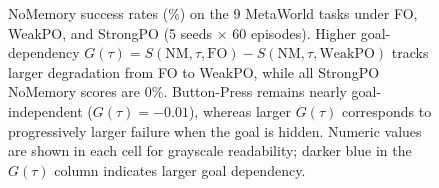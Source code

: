 \begin{figure}[t]
\caption{NoMemory success rates (\%) on the 9 MetaWorld tasks under FO, WeakPO, and StrongPO (5 seeds $\times$ 60 episodes). Higher goal-dependency $G(\tau)=S(\mathrm{NM},\tau,\mathrm{FO})-S(\mathrm{NM},\tau,\mathrm{WeakPO})$ tracks larger degradation from FO to WeakPO, while all StrongPO NoMemory scores are 0\%. Button-Press remains nearly goal-independent ($G(\tau)=-0.01$), whereas larger $G(\tau)$ corresponds to progressively larger failure when the goal is hidden. Numeric values are shown in each cell for grayscale readability; darker blue in the $G(\tau)$ column indicates larger goal dependency.}
\label{fig:goal_dependency}
\end{figure}
